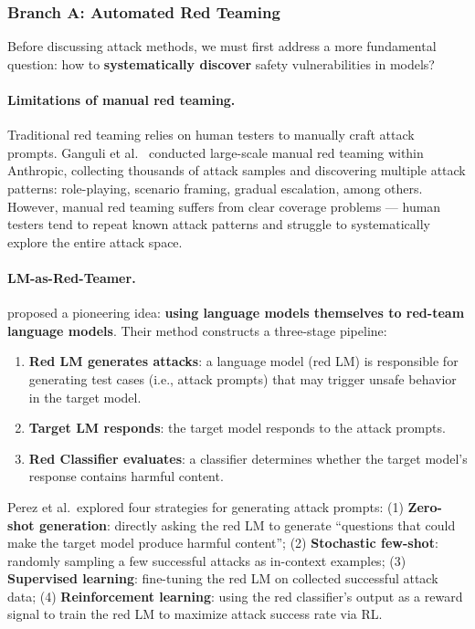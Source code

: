 \subsubsection{Branch A: Automated Red Teaming}
\label{sec:t3-redteam}

Before discussing attack methods, we must first address a more fundamental question:
how to \textbf{systematically discover} safety vulnerabilities in models?

\paragraph{Limitations of manual red teaming.}
Traditional red teaming relies on human testers to manually craft attack prompts.
Ganguli et al.\ \cite{ganguli2022redteaming} conducted large-scale manual red teaming within Anthropic,
collecting thousands of attack samples and discovering multiple attack patterns:
role-playing, scenario framing,
gradual escalation, among others.
However, manual red teaming suffers from clear coverage problems ---
human testers tend to repeat known attack patterns and struggle to systematically explore the entire attack space.

\paragraph{LM-as-Red-Teamer.}
 proposed a pioneering idea:
\textbf{using language models themselves to red-team language models}.
Their method constructs a three-stage pipeline:

\begin{enumerate}[leftmargin=2em]
  \item \textbf{Red LM generates attacks}: a language model (red LM) is responsible for generating test cases (i.e., attack prompts) that may trigger unsafe behavior in the target model.
  \item \textbf{Target LM responds}: the target model responds to the attack prompts.
  \item \textbf{Red Classifier evaluates}: a classifier determines whether the target model's response contains harmful content.
\end{enumerate}

\noindent
Perez et al.\ explored four strategies for generating attack prompts:
(1) \textbf{Zero-shot generation}: directly asking the red LM to generate ``questions that could make the target model produce harmful content'';
(2) \textbf{Stochastic few-shot}: randomly sampling a few successful attacks as in-context examples;
(3) \textbf{Supervised learning}: fine-tuning the red LM on collected successful attack data;
(4) \textbf{Reinforcement learning}: using the red classifier's output as a reward signal
to train the red LM to maximize attack success rate via RL.

